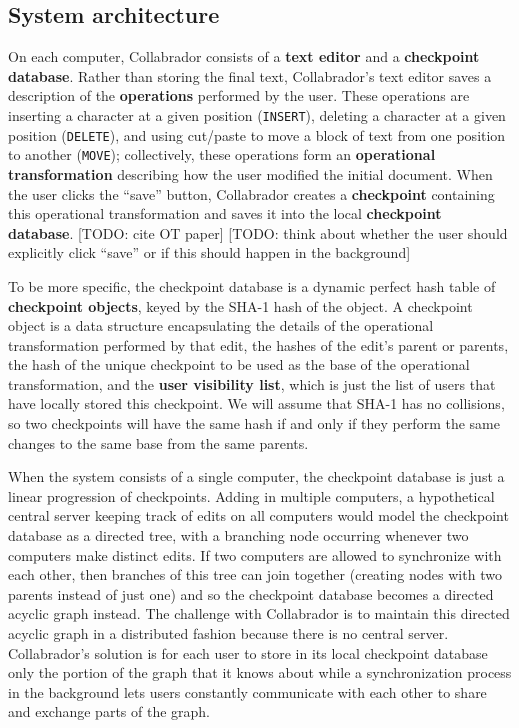 \documentclass[11pt,titlepage]{article}
\begin{document}
\subsection{System architecture}

On each computer, Collabrador consists of a \textbf{text editor} and a
\textbf{checkpoint database}. Rather than storing the final text,
Collabrador's text editor saves a description of the
\textbf{operations} performed by the user. These operations are
inserting a character at a given position (\texttt{INSERT}), deleting
a character at a given position (\texttt{DELETE}), and using cut/paste
to move a block of text from one position to another (\texttt{MOVE});
collectively, these operations form an \textbf{operational
  transformation} describing how the user modified the initial
document. When the user clicks the ``save'' button, Collabrador
creates a \textbf{checkpoint} containing this operational
transformation and saves it into the local \textbf{checkpoint
  database}. [TODO: cite OT paper] [TODO: think about whether the user
should explicitly click ``save'' or if this should happen in the
background]

To be more specific, the checkpoint database is a dynamic perfect hash
table of \textbf{checkpoint objects}, keyed by the SHA-1 hash of the
object. A checkpoint object is a data structure encapsulating the
details of the operational transformation performed by that edit, the
hashes of the edit's parent or parents, the hash of the unique
checkpoint to be used as the base of the operational transformation,
and the \textbf{user visibility list}, which is just the list of users
that have locally stored this checkpoint. We will assume that SHA-1
has no collisions, so two checkpoints will have the same hash if and
only if they perform the same changes to the same base from the same
parents.

When the system consists of a single computer, the checkpoint database
is just a linear progression of checkpoints. Adding in multiple
computers, a hypothetical central server keeping track of edits on all
computers would model the checkpoint database as a directed tree, with
a branching node occurring whenever two computers make distinct
edits. If two computers are allowed to synchronize with each other,
then branches of this tree can join together (creating nodes with two
parents instead of just one) and so the checkpoint database becomes a
directed acyclic graph instead. The challenge with Collabrador is to
maintain this directed acyclic graph in a distributed fashion because
there is no central server. Collabrador's solution is for each user to
store in its local checkpoint database only the portion of the graph
that it knows about while a synchronization process in the background
lets users constantly communicate with each other to share and
exchange parts of the graph.
\end{document}
